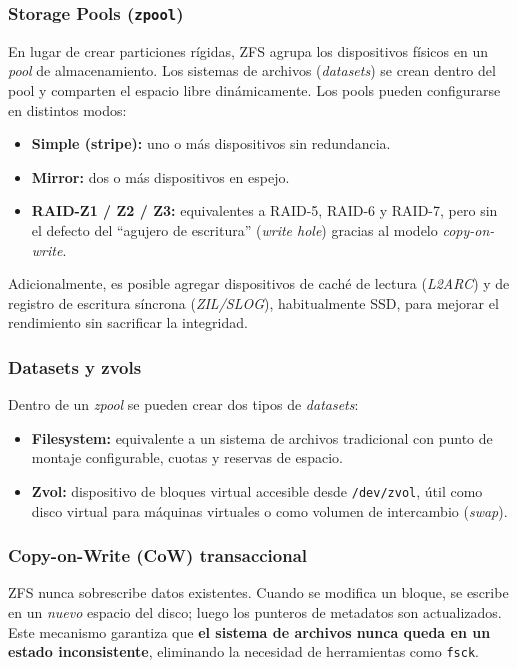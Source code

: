 \documentclass[12pt,letterpaper]{article}
\begin{document}
\subsubsection{Storage Pools (\texttt{zpool})}
En lugar de crear particiones rígidas, ZFS agrupa los dispositivos físicos en un \emph{pool} de almacenamiento.
Los sistemas de archivos (\emph{datasets}) se crean dentro del pool y comparten el espacio libre dinámicamente.
Los pools pueden configurarse en distintos modos:

\begin{itemize}
\item \textbf{Simple (stripe):} uno o más dispositivos sin redundancia.
\item \textbf{Mirror:} dos o más dispositivos en espejo.
\item \textbf{RAID-Z1 / Z2 / Z3:} equivalentes a RAID-5, RAID-6 y RAID-7, pero sin el defecto del
  ``agujero de escritura'' (\emph{write hole}) gracias al modelo \emph{copy-on-write}.
\end{itemize}

Adicionalmente, es posible agregar dispositivos de caché de lectura (\emph{L2ARC}) y de registro de escritura
síncrona (\emph{ZIL/SLOG}), habitualmente SSD, para mejorar el rendimiento sin sacrificar la integridad.

\subsubsection{Datasets y zvols}
Dentro de un \emph{zpool} se pueden crear dos tipos de \emph{datasets}:

\begin{itemize}
\item \textbf{Filesystem:} equivalente a un sistema de archivos tradicional con punto de montaje configurable,
  cuotas y reservas de espacio.
\item \textbf{Zvol:} dispositivo de bloques virtual accesible desde \texttt{/dev/zvol}, útil como disco virtual
  para máquinas virtuales o como volumen de intercambio (\emph{swap}).
\end{itemize}

\subsubsection{Copy-on-Write (CoW) transaccional}
ZFS nunca sobrescribe datos existentes. Cuando se modifica un bloque, se escribe en un \emph{nuevo} espacio del
disco; luego los punteros de metadatos son actualizados. Este mecanismo garantiza que \textbf{el sistema de archivos nunca queda en un estado inconsistente}, eliminando la necesidad de herramientas como \texttt{fsck}.
\end{document}
